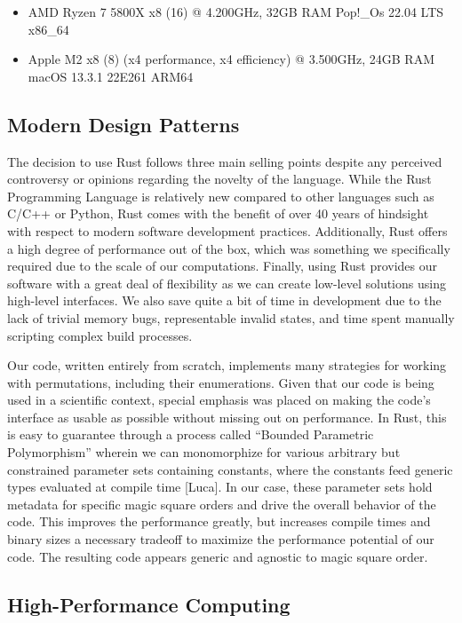 \documentclass{rhumj_new}
\begin{document}
\begin{itemize}
  \item AMD Ryzen 7 5800X x8 (16) @ 4.200GHz, 32GB RAM \textemdash{}  Pop!\_Os 22.04 LTS x86\_64
  \item Apple M2 x8 (8) (x4 performance, x4 efficiency) @ 3.500GHz, 24GB RAM \textemdash{} macOS
        13.3.1
        22E261 ARM64
\end{itemize}

\subsection{Modern Design Patterns}

The decision to use Rust follows three main selling points despite any perceived controversy
or opinions regarding the novelty of the language. While the Rust Programming Language is
relatively new compared to other languages such as C/C++ or Python, Rust comes with the benefit of
over 40 years of hindsight with respect to modern software development practices. Additionally,
Rust offers a high degree of performance out of the box, which was something we specifically
required due to the scale of our computations. Finally, using Rust provides our software with a
great deal of flexibility as we can create low-level solutions using high-level interfaces. We also
save quite a bit of time in development due to the lack of trivial memory bugs, representable
invalid states, and time spent manually scripting complex build processes.

Our code, written entirely from scratch, implements many strategies for working with
permutations, including their enumerations. Given that our code is being used in a scientific
context, special emphasis was placed on making the code's interface as usable as possible without
missing out on performance. In Rust, this is easy to guarantee through a process called ``Bounded
Parametric Polymorphism'' wherein we can monomorphize for various arbitrary but constrained
parameter sets containing constants, where the constants feed generic types evaluated at compile
time [Luca]. In our case, these parameter sets hold metadata for specific magic square orders and
drive the overall behavior of the code. This improves the performance greatly, but increases
compile times and binary sizes \textemdash{} a necessary tradeoff to maximize the performance
potential
of our code. The resulting code appears generic and agnostic to magic square order.

\subsection{High-Performance Computing}
\end{document}
